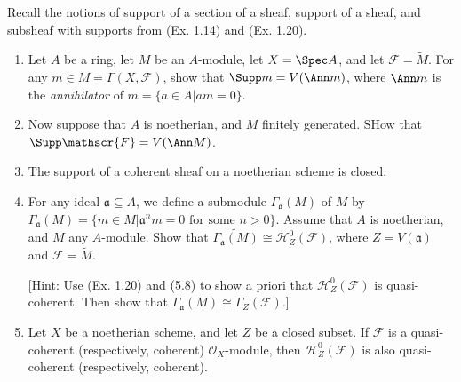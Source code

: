 \begin{exercise}[Support.] %
	Recall the notions of support of a section of a sheaf, support of a sheaf, and subsheaf with supports from (Ex. 1.14) and (Ex. 1.20).
	\begin{enumerate}
		\item Let $A $ be a ring, let $M $ be an $A $-module, let $X = \Spec A $, and let $\mathscr{F} = \tilde{M} $. For any $m \in M = \Gamma(X,\mathscr{F}) $, show that $\Supp m = V(\Ann m) $, where $\Ann m $ is the \textit{annihilator} of $m = \{a \in A | am = 0\}   $.
		\item Now suppose that $A $ is noetherian, and $M $ finitely generated. SHow that $\Supp \mathscr{F} = V(\Ann M) $.
		\item The support of a coherent sheaf on a noetherian scheme is closed.
		\item For any ideal $\mathfrak{a} \subseteq A $, we define a submodule $\Gamma_{\mathfrak{a}}(M) $ of $M $ by $\Gamma_{\mathfrak{a}}(M) = \{m \in M | \mathfrak{a}^n m = 0 \text{ for some }n > 0\}   $. Assume that $A $ is noetherian, and $M $ any $A $-module. Show that $\tilde{\Gamma_{\mathfrak{a}}(M)} \cong \mathscr{H}_Z^0(\mathscr{F}) $, where $Z = V(\mathfrak{a}) $ and $\mathscr{F} = \tilde{M} $.

			[Hint: Use (Ex. 1.20) and (5.8) to show a priori that $\mathscr{H}^{0}_{Z}(\mathscr{F}) $ is quasi-coherent. Then show that $\Gamma_{\mathfrak{a}}(M)\cong \Gamma _Z (\mathscr{F})$.]
		\item Let $X $ be a noetherian scheme, and let $Z $ be a closed subset. If $\mathscr{F} $ is a quasi-coherent (respectively, coherent) $\mathscr{O}_X $-module, then $\mathscr{H}_Z^0(\mathscr{F}) $ is also quasi-coherent (respectively, coherent).
	\end{enumerate}
\end{exercise}
